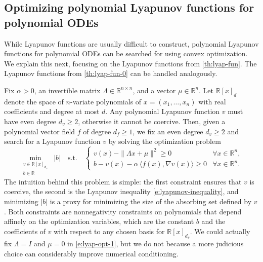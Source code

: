 \documentclass[11pt]{amsart}
\numberwithin{equation}{section}
\theoremstyle{plain}
\theoremstyle{definition}
\theoremstyle{remark}
\newcommand{\R}{\mathbb{R}}
\renewcommand{\vec}[1]{{#1}}
\newcommand{\mat}[1]{{#1}}
\newcommand{\ip}[2]{\langle #1, #2 \rangle}
\begin{document}
\subsection{Optimizing polynomial Lyapunov functions for polynomial ODEs}\label{ss:model-based-lyap}

While Lyapunov functions are usually difficult to construct, polynomial Lyapunov functions for polynomial ODEs can be searched for using convex optimization. We explain this next, focusing on the Lyapunov functions from \cref{th:lyap-fun}. The Lyapunov functions from \cref{th:lyap-fun-0} can be handled analogously.

Fix $\alpha>0$, an invertible matrix $\mat{\Lambda} \in \R^{n\times n}$, and a vector $\vec{\mu} \in \R^n$. Let $\R[\vec{x}]_{d}$ denote the space of $n$-variate polynomials of $\vec{x}=(x_1,\ldots,x_n)$ with real coefficients and degree at most $d$. Any polynomial Lyapunov function $v$ must have even degree $d_v\geq 2$, otherwise it cannot be coercive. Then, given a polynomial vector field $f$ of degree $d_f \geq 1$, we fix an even degree $d_v \geq 2$ and search for a Lyapunov function $v$ by solving the optimization problem
\begin{equation}\label{e:lyap-opt-1}
    \min_{\substack{v \in \R[\vec{x}]_{d_v} \\ b \in \R}} \; |b| \quad
    \text{s.t.} \quad 
    \begin{cases}
        v(\vec{x}) - \|\mat{\Lambda}\vec{x} + \vec{\mu}\|^2 \geq 0 &\forall \vec{x} \in \R^n, \\
        b - v(\vec{x}) - \alpha\,  \ip{\vec{f}(\vec{x})}{\nabla v(\vec{x})}  \geq 0 &\forall \vec{x} \in \R^n.
    \end{cases}
\end{equation}
The intuition behind this problem is simple: the first constraint ensures that $v$ is coercive, the second is the Lyapunov inequality \cref{e:lyapunov-inequality}, and minimizing $|b|$ is a proxy for minimizing the size of the absorbing set defined by $v$. Both constraints are nonnegativity constraints on polynomials that depend affinely on the optimization variables, which are the constant $b$ and the coefficients of $v$ with respect to any chosen basis for $\R[\vec{x}]_{d_v}$.
We could actually fix $\mat{\Lambda}=I$ and $\vec{\mu}=0$ in \cref{e:lyap-opt-1}, but we do not because a more judicious choice can considerably improve numerical conditioning.
\end{document}
